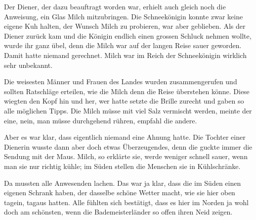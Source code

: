 Der Diener, der dazu beauftragt worden war, erhielt auch gleich noch die Anweisung, ein Glas Milch mitzubringen. Die Schneekönigin konnte zwar keine eigene Kuh halten, der Wunsch Milch zu probieren, war aber geblieben. Als der Diener zurück kam und die Königin endlich einen grossen Schluck nehmen wollte, wurde ihr ganz übel, denn die Milch war auf der langen Reise sauer geworden. Damit hatte niemand gerechnet. Milch war im Reich der Schneekönigin wirklich sehr unbekannt. 

Die weisesten Männer und Frauen des Landes wurden zusammengerufen und sollten Ratschläge erteilen, wie die Milch denn die Reise überstehen könne. Diese wiegten den Kopf hin und her, wer hatte setzte die Brille zurecht und gaben so alle möglichen Tipps. Die Milch müsse mit viel Salz vermischt werden, meinte der eine, nein, man müsse durchgehend rühren, empfahl die andere. 

Aber es war klar, dass eigentlich niemand eine Ahnung hatte. Die Tochter einer Dienerin wusste dann aber doch etwas Überzeugendes, denn die guckte immer die Sendung mit der Maus. Milch, so erklärte sie, werde weniger schnell sauer, wenn man sie nur richtig kühle; im Süden stellen die Menschen sie in Kühlschränke.

Da mussten alle Anwesenden lachen. Das war ja klar, dass die im Süden einen eigenen Schrank haben, der dasselbe schöne Wetter macht, wie sie hier oben tagein, tagaus hatten. Alle fühlten sich bestätigt, dass es hier im Norden ja wohl doch am schönsten, wenn die Bademeisterländer so offen ihren Neid zeigen.

